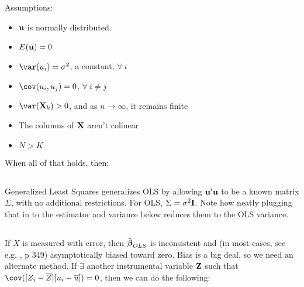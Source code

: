 Assumptions:

\begin{itemize}
\item ${\bf u}$ is normally distributed.
\item $E({\bf u}) = 0$
\item $\var(u_i) = \sigma^2$, a constant, $\forall\ i$
\item $\cov(u_i, u_j) = 0$, $\forall\ i\neq j$
\item $\var(\Xv_k)>0$, and as $n\to\infty$, it remains finite
\item The columns of ${\bf X}$ aren't colinear
\item $N>K$
\end{itemize}

When all of that holds, then:

\subsection{}					\label{GLS}
Generalized Least Squares generalizes OLS by allowing ${\bf u}'{\bf u}$ to be a
known matrix $\Sigma$, with no additional restrictions. For OLS,
$\Sigma=\sigma^2{\bf I}$. Note how neatly plugging that in to the
estimator and variance below reduces them to the OLS variance.


\subsection{}			\label{IV}

If $X$ is measured with error, then $\hat{{\mbox{\boldmath$\beta$}}}_{OLS}$ is inconsistent
and (in most cases, see e.g. \cite{kmenta}, p 349) asymptotically biased
toward zero. Bias is a big deal, so we need an alternate method. If
$\exists$ another instrumental variable ${\bf Z}$ such that $\cov([Z_i-\overline
Z][u_i-\overline u])=0$, then we can do the following:

